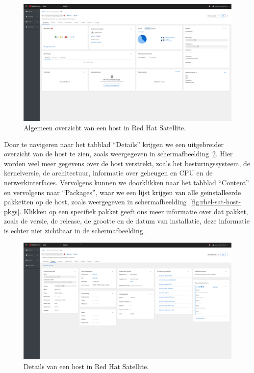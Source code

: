\begin{figure}[h!]
    \includegraphics[width=\textwidth]
    {./graphics/state-of-the-art/rhel-satellite/rhel-sat-host-overview.png}
    \caption[Algemeen overzicht van host in Satellite.]{\label{fig:rhel-sat-host-overview}Algemeen overzicht van een host in Red Hat Satellite.}
\end{figure}

Door te navigeren naar het tabblad ``Details'' krijgen we een uitgebreider overzicht van de host te zien, zoals weergegeven in schermafbeelding~\ref{fig:rhel-sat-host-details}.
Hier worden veel meer gegevens over de host verstrekt, zoals het besturingssysteem, de kernelversie, de architectuur, informatie over geheugen en CPU en de netwerkinterfaces.
Vervolgens kunnen we doorklikken naar het tabblad ``Content'' en vervolgens naar ``Packages'', waar we een lijst krijgen van alle ge\"installeerde pakketten op de host, zoals weergegeven in schermafbeelding~\ref{fig:rhel-sat-host-pkgs}.
Klikken op een specifiek pakket geeft ons meer informatie over dat pakket, zoals de versie, de release, de grootte en de datum van installatie, deze informatie is echter niet zichtbaar in de schermafbeelding.

\begin{figure}[h!]
    \includegraphics[width=\textwidth]
    {./graphics/state-of-the-art/rhel-satellite/rhel-sat-host-details.png}
    \caption[Details van host in Red Hat Satellite.]{\label{fig:rhel-sat-host-details}Details van een host in Red Hat Satellite.}
\end{figure}

